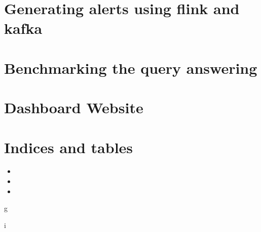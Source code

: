 \documentclass[letterpaper,10pt,english]{sphinxmanual}
\begin{document}
\chapter{Generating alerts using flink and kafka}
\label{\detokenize{flink:generating-alerts-using-flink-and-kafka}}\label{\detokenize{flink::doc}}

\chapter{Benchmarking the query answering}
\label{\detokenize{benchmarking:benchmarking-the-query-answering}}\label{\detokenize{benchmarking::doc}}

\chapter{Dashboard Website}
\label{\detokenize{dashboard_website:dashboard-website}}\label{\detokenize{dashboard_website::doc}}

\chapter{Indices and tables}
\label{\detokenize{index:indices-and-tables}}\begin{itemize}
\item {} 

\item {} 

\item {} 

\end{itemize}


\renewcommand{\indexname}{Python Module Index}
\begin{sphinxtheindex}
\def\bigletter#1{{\Large\sffamily#1}\nopagebreak\vspace{1mm}}
\bigletter{g}
\item {}
\indexspace
\bigletter{i}
\item {}
\end{sphinxtheindex}

\renewcommand{\indexname}{Index}
\printindex
\end{document}
